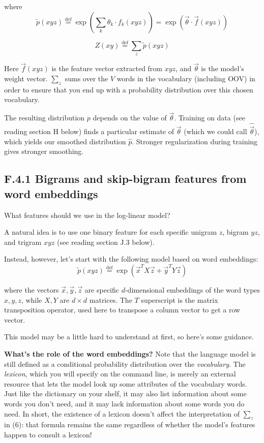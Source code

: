 \documentclass[12pt]{article}
\theoremstyle{plain}
\theoremstyle{definition}
\theoremstyle{remark}
\begin{document}
where  
\begin{equation}
\tilde{p}(xyz) \overset{\text{def}}{=} \exp\left(\sum_k \theta_k \cdot f_k(xyz)\right) = \exp\left(\vec{\theta} \cdot \vec{f}(xyz)\right)
\end{equation}  

\begin{equation}
Z(xy) \overset{\text{def}}{=} \sum_z \tilde{p}(xyz)
\end{equation}  

Here $\vec{f}(xyz)$ is the feature vector extracted from $xyz$, and $\vec{\theta}$ is the model’s weight vector. $\sum_z$ sums over the 
$V$ words in the vocabulary (including OOV) in order to ensure that you end up with a probability distribution 
over this chosen vocabulary.  

The resulting distribution $p$ depends on the value of $\vec{\theta}$. Training on data (see reading section H below) 
finds a particular estimate of $\vec{\theta}$ (which we could call $\hat{\vec{\theta}}$), which yields our smoothed distribution $\hat{p}$. Stronger 
regularization during training gives stronger smoothing.  

\subsection*{F.4.1 \quad Bigrams and skip-bigram features from word embeddings}

What features should we use in the log-linear model?  

A natural idea is to use one binary feature for each specific unigram $z$, bigram $yz$, and trigram $xyz$ (see 
reading section J.3 below).  

Instead, however, let’s start with the following model based on word embeddings:  
\begin{equation}
\tilde{p}(xyz) \overset{\text{def}}{=} \exp\left(\vec{x}^T X \vec{z} + \vec{y}^T Y \vec{z}\right)
\end{equation}  

where the vectors $\vec{x}, \vec{y}, \vec{z}$ are specific $d$-dimensional embeddings of the word types $x, y, z$, while $X, Y$ are 
$d \times d$ matrices. The $T$ superscript is the matrix transposition operator, used here to transpose a column 
vector to get a row vector.  

This model may be a little hard to understand at first, so here’s some guidance.  

\textbf{What’s the role of the word embeddings?} Note that the language model is still defined as a conditional 
probability distribution over the \textit{vocabulary}. The \textit{lexicon}, which you will specify on the command line, 
is merely an external resource that lets the model look up some attributes of the vocabulary words. Just 
like the dictionary on your shelf, it may also list information about some words you don’t need, and it 
may lack information about some words you do need. In short, the existence of a lexicon doesn’t affect 
the interpretation of $\sum_z$ in (6): that formula remains the same regardless of whether the model’s features 
happen to consult a lexicon!  
\end{document}
